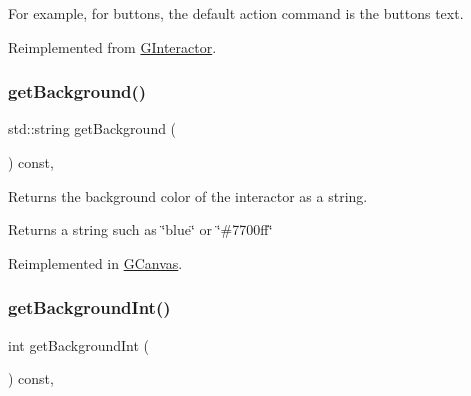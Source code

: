 For example, for buttons, the default action command is the button\textquotesingle{}s text. 

Reimplemented from \mbox{\hyperlink{classsgl_1_1GInteractor_a94eb4276000c4fdfb508ce9e6317a82a}{G\+Interactor}}.

\mbox{\label{classsgl_1_1GInteractor_a808e22cc1fdfbecf71ed8c64ef4600e0}} 
\subsubsection{\texorpdfstring{get\+Background()}{getBackground()}}
{\footnotesize\ttfamily std\+::string get\+Background (\begin{DoxyParamCaption}{ }\end{DoxyParamCaption}) const\hspace{0.3cm}{\ttfamily [virtual]}, {\ttfamily [inherited]}}



Returns the background color of the interactor as a string. 

\begin{DoxyReturn}{Returns}
a string such as \char`\"{}blue\char`\"{} or \char`\"{}\#7700ff\char`\"{} 
\end{DoxyReturn}


Reimplemented in \mbox{\hyperlink{classsgl_1_1GCanvas_a4a62c51b7244a7642b88065e3a07ae82}{G\+Canvas}}.

\mbox{\label{classsgl_1_1GInteractor_a9e827257a55cb8cf4d9de2ec6bcfd7a0}} 
\subsubsection{\texorpdfstring{get\+Background\+Int()}{getBackgroundInt()}}
{\footnotesize\ttfamily int get\+Background\+Int (\begin{DoxyParamCaption}{ }\end{DoxyParamCaption}) const\hspace{0.3cm}{\ttfamily [virtual]}, {\ttfamily [inherited]}}



